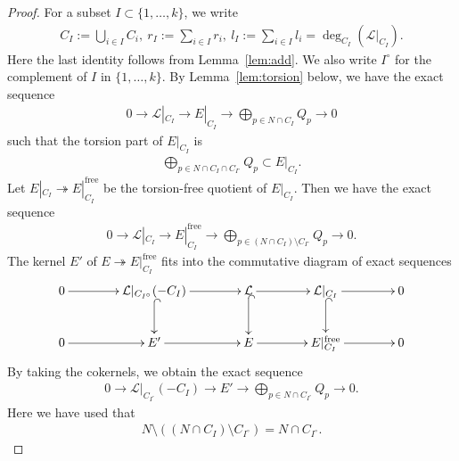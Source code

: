 \documentclass[11pt,oneside,a4paper,mathscr]{amsart}
\theoremstyle{definition}
\begin{document}
\begin{proof}
For a subset $I \subset \{1, \ldots, k\}$, 
we write 
\begin{align*}
    C_I:=\bigcup_{i\in I} C_i, \ r_I:=\sum_{i\in I} r_i, \ 
    l_I:=\sum_{i\in I} l_i=\deg_{C_I}(\mathcal{L}|_{C_I}).
\end{align*}
Here the last identity follows from Lemma~\ref{lem:add}.
We also write $I^{\circ}$ for the complement of $I$ in $\{1, \ldots, k\}$. 
By Lemma~\ref{lem:torsion} below, 
we have the exact sequence 
\begin{align*}
    0\to \mathcal{L}|_{C_I} \to E|_{C_I}\to \bigoplus_{p\in N \cap C_I}Q_p \to 0
\end{align*}
such that the torsion part of $E|_{C_I}$ is 
\begin{align*}
    \bigoplus_{p\in N \cap C_I \cap C_{I^{\circ}}}Q_p \subset E|_{C_I}. 
\end{align*}
Let $E|_{C_I}\twoheadrightarrow E|_{C_I}^{\mathrm{free}}$ be the torsion-free quotient of $E|_{C_I}$. Then we have the 
exact sequence 
\begin{align}\label{ex:E1}
    0\to \mathcal{L}|_{C_I} \to E|_{C_I}^{\mathrm{free}} \to \bigoplus_{p\in (N\cap C_I) \setminus C_{I^{\circ}}}Q_p \to 0. 
\end{align}
The kernel $E'$ of $E\twoheadrightarrow E|_{C_I}^{\mathrm{free}}$
fits into the commutative diagram of exact sequences
\begin{equation}\label{com:exE}
\xymatrix@C=4em{
0 \ar[r]
&
\mathcal{L}|_{C_{I^\circ}}(-C_I)
\ar[r]
\ar@{^{(}->}[d]
&
\mathcal{L}
\ar[r]
\ar@{^{(}->}[d]
&
\mathcal{L}|_{C_I}
\ar[r]
\ar@{^{(}->}[d]
&
0
\\
0 \ar[r]
&
E'
\ar[r]
&
E
\ar[r]
&
E|_{C_I}^{\mathrm{free}}
\ar[r]
&
0
}
\end{equation}
By taking the cokernels, we obtain the exact sequence 
\begin{align}\label{ex:E2}
    0\to \mathcal{L}|_{C_{I^{\circ}}}(-C_I)\to E' \to \bigoplus_{p\in N\cap C_{I^{\circ}}}Q_p  \to 0. 
\end{align}
Here we have used that 
\begin{align*}
  N \setminus ((N\cap C_I)\setminus C_{I^{\circ}})=N\cap C_{I^{\circ}}.  
\end{align*}


\end{proof}
\end{document}
